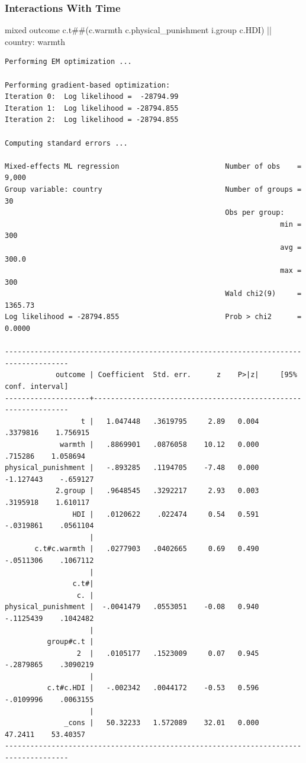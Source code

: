 \documentclass[
  letterpaper,
  DIV=11,
  numbers=noendperiod]{scrreprt}
\newenvironment{Shaded}{\begin{snugshade}}{\end{snugshade}}
\newcommand{\FunctionTok}[1]{\textcolor[rgb]{0.28,0.35,0.67}{#1}}
\newcommand{\NormalTok}[1]{\textcolor[rgb]{0.00,0.23,0.31}{#1}}
\begin{document}
\subsubsection{Interactions With Time}\label{interactions-with-time}

\begin{Shaded}
\begin{Highlighting}[]

\NormalTok{mixed outcome c.t\#\#(c.warmth c.physical\_punishment i.}\FunctionTok{group}\NormalTok{ c.HDI) || country: warmth}
\end{Highlighting}
\end{Shaded}

\begin{verbatim}
Performing EM optimization ...

Performing gradient-based optimization: 
Iteration 0:  Log likelihood =  -28794.99  
Iteration 1:  Log likelihood = -28794.855  
Iteration 2:  Log likelihood = -28794.855  

Computing standard errors ...

Mixed-effects ML regression                         Number of obs    =   9,000
Group variable: country                             Number of groups =      30
                                                    Obs per group:
                                                                 min =     300
                                                                 avg =   300.0
                                                                 max =     300
                                                    Wald chi2(9)     = 1365.73
Log likelihood = -28794.855                         Prob > chi2      =  0.0000

-------------------------------------------------------------------------------------
            outcome | Coefficient  Std. err.      z    P>|z|     [95% conf. interval]
--------------------+----------------------------------------------------------------
                  t |   1.047448   .3619795     2.89   0.004     .3379816    1.756915
             warmth |   .8869901   .0876058    10.12   0.000      .715286    1.058694
physical_punishment |   -.893285   .1194705    -7.48   0.000    -1.127443    -.659127
            2.group |   .9648545   .3292217     2.93   0.003     .3195918    1.610117
                HDI |   .0120622    .022474     0.54   0.591    -.0319861    .0561104
                    |
       c.t#c.warmth |   .0277903   .0402665     0.69   0.490    -.0511306    .1067112
                    |
                c.t#|
                 c. |
physical_punishment |  -.0041479   .0553051    -0.08   0.940    -.1125439    .1042482
                    |
          group#c.t |
                 2  |   .0105177   .1523009     0.07   0.945    -.2879865    .3090219
                    |
          c.t#c.HDI |   -.002342   .0044172    -0.53   0.596    -.0109996    .0063155
                    |
              _cons |   50.32233   1.572089    32.01   0.000      47.2411    53.40357
-------------------------------------------------------------------------------------


\end{verbatim}
\end{document}

